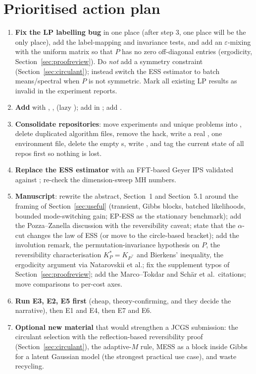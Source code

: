 \documentclass[11pt,a4paper]{article}
\theoremstyle{remark}
\begin{document}
\section{Prioritised action plan}
\begin{enumerate}[leftmargin=*]
\item \textbf{Fix the LP labelling bug} in one place (after step 3, one place will be the only place), add the label-mapping and invariance tests, and add an $\varepsilon$-mixing with the uniform matrix so that $P$ has no zero off-diagonal entries (ergodicity, Section~\ref{sec:proofreview}). Do \emph{not} add a symmetry constraint (Section~\ref{sec:circulant}); instead switch the ESS estimator to batch means/spectral when $P$ is not symmetric. Mark all existing LP results as invalid in the experiment reports.
\item \textbf{Add } with , ,  (lazy ); add  in ; add .
\item \textbf{Consolidate repositories}: move  experiments and unique problems into , delete duplicated algorithm files, remove the  hack, write a real , one environment file, delete the empty s, write , and tag the current state of all repos first so nothing is lost.
\item \textbf{Replace the ESS estimator} with an FFT-based Geyer IPS validated against ; re-check the dimension-sweep MH numbers.
\item \textbf{Manuscript}: rewrite the abstract, Section~1 and Section~5.1 around the framing of Section~\ref{sec:useful} (transient, Gibbs blocks, batched likelihoods, bounded mode-switching gain; EP-ESS as the stationary benchmark); add the Pozza--Zanella discussion with the reversibility caveat; state that the $\alpha$-cut changes the law of ESS (or move to the circle-based bracket); add the involution remark, the permutation-invariance hypothesis on $P$, the reversibility characterisation $K_P^*=K_{P^\top}$ and Bierkens' inequality, the ergodicity argument via Natarovskii et al.; fix the supplement typos of Section~\ref{sec:proofreview}; add the Marco--Tokdar and Schär et al.\ citations; move comparisons to per-cost axes.
\item \textbf{Run E3, E2, E5 first} (cheap, theory-confirming, and they decide the narrative), then E1 and E4, then E7 and E6.
\item \textbf{Optional new material} that would strengthen a JCGS submission: the circulant selection with the reflection-based reversibility proof (Section~\ref{sec:circulant}), the adaptive-$M$ rule, MESS as a block inside Gibbs for a latent Gaussian model (the strongest practical use case), and waste recycling.
\end{enumerate}
\end{document}

